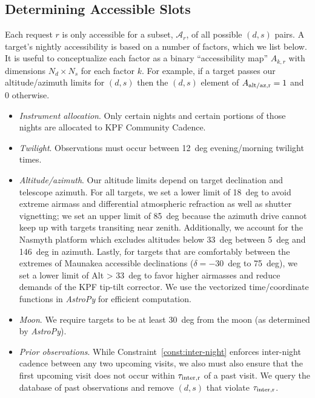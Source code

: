 \documentclass[twocolumn,linenumbers]{aastex63}
\newcommand{\isr}[2]{\ensuremath{#1_{\rm #2}}\xspace}
\begin{document}
\subsection{Determining Accessible Slots}
\label{subsec:unavailable}

Each request $r$ is only accessible for a subset, $\mathcal{A}_r$, of all possible $(d,s)$ pairs. A target's nightly accessibility is based on a number of factors, which we list below. It is useful to conceptualize each factor as a binary ``accessibility map'' $A_{k,r}$ with dimensions $N_d \times N_s$ for each factor $k$. For example, if a target passes our altitude/azimuth limits for $(d,s)$ then the $(d,s)$ element of $\isr{A}{alt/az,r} = 1$ and 0 otherwise. 

\begin{itemize}
\item {\em Instrument allocation}. Only certain nights and certain portions of those nights are allocated to KPF Community Cadence.

\item {\em Twilight}. Observations must occur between 12~deg evening/morning twilight times.

\item {\em Altitude/azimuth}. Our altitude limits depend on target declination and telescope azimuth. For all targets, we set a lower limit of 18~deg to avoid extreme airmass and differential atmospheric refraction as well as shutter vignetting; we set an upper limit of 85~deg because the azimuth drive cannot keep up with targets transiting near zenith. Additionally, we account for the Nasmyth platform which excludes altitudes below 33~deg between 5~deg and 146~deg in azimuth. Lastly, for targets that are comfortably between the extremes of Maunakea accessible declinations  ($\delta = -30$~deg to 75~deg), we set a lower limit of Alt > 33~deg to favor higher airmasses and reduce demands of the KPF tip-tilt corrector. We use the vectorized time/coordinate functions in {\em AstroPy} for efficient computation. 

\item {\em Moon}. We require targets to be at least 30~deg from the moon (as determined by {\em AstroPy}).

\item {\em Prior observations}. While Constraint~\ref{const:inter-night} enforces inter-night cadence between any two upcoming visits, we also must also ensure that the first upcoming visit does not occur within \isr{\tau}{inter,r} of a past visit. We query the database of past observations and remove $(d,s)$ that violate \isr{\tau}{inter,r}.


\end{itemize}
\end{document}
